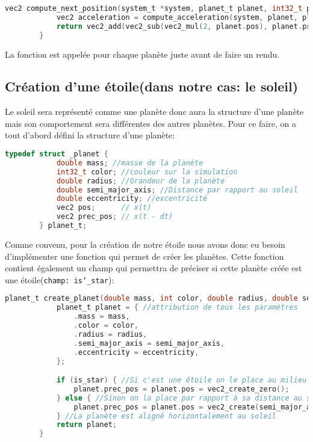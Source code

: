 \documentclass[a4paper,10pt]{article}
\begin{document}
    \begin{lstlisting}[language=c,label={lst:lstlisting6}]
        vec2 compute_next_position(system_t *system, planet_t planet, int32_t planet_index, double delta_t) {
            vec2 acceleration = compute_acceleration(system, planet, planet_index);
            return vec2_add(vec2_sub(vec2_mul(2, planet.pos), planet.prec_pos), vec2_mul(pow(delta_t, 2), acceleration));
        }
    \end{lstlisting}

    La fonction est appelée pour chaque planète juste avant de faire un rendu.

    \subsection{Création d'une étoile(dans notre cas: le soleil)}\label{subsec:création-d'une-étoile(dans-notre-cas:-le-soleil)}

    Le soleil sera représenté comme une planète donc aura la structure d'une planète mais son comportement sera différentes des autres planètes.
    Pour ce faire, on a tout d'abord défini la structure d'une planète:

    \begin{lstlisting}[language=c,label={lst:lstlisting}]
        typedef struct _planet {
            double mass; //masse de la planète
            int32_t color; //couleur sur la simulation
            double radius; //Grandeur de la planète
            double semi_major_axis; //Distance par rapport au soleil
            double eccentricity; //excentricité
            vec2 pos;      // x(t)
            vec2 prec_pos; // x(t - dt)
        } planet_t;
    \end{lstlisting}

    Comme convenu, pour la création de notre étoile nous avons donc eu besoin d'implémenter une fonction qui permet de créer les planètes.
    Cette fonction contient également un champ qui permettra de préciser si cette planète créée est une étoile(\texttt{champ: is\char`_star}):
    
    \begin{lstlisting}[language=c,label={lst:lstlisting2}]
        planet_t create_planet(double mass, int color, double radius, double semi_major_axis, double eccentricity, bool is_star) {
            planet_t planet = { //attribution de tous les paramètres
                .mass = mass,
                .color = color,
                .radius = radius,
                .semi_major_axis = semi_major_axis,
                .eccentricity = eccentricity,
            };

            if (is_star) { //Si c'est une étoile on le place au milieu donc vecteur 0
                planet.prec_pos = planet.pos = vec2_create_zero();
            } else { //Sinon on la place par rapport à sa distance au soleil(étoile) et son excentricité
                planet.prec_pos = planet.pos = vec2_create(semi_major_axis * (1 - eccentricity), 0);
            } //La planète est aligné horizontalement au soleil
            return planet;
        }
    \end{lstlisting}
\end{document}
